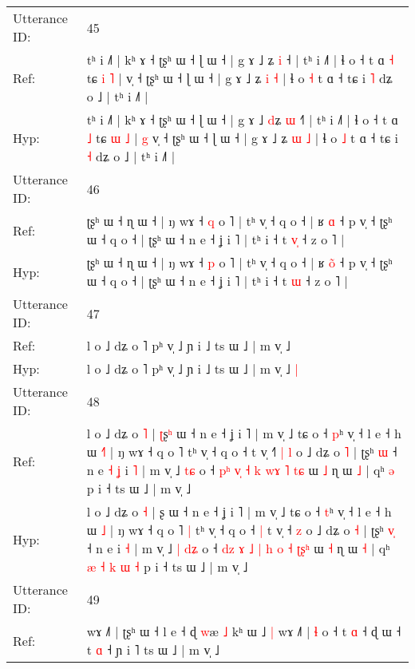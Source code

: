 \documentclass[10pt]{article}
\DeclareRobustCommand{\hl}[1]{{\textcolor{red}{#1}}}
\begin{document}
\begin{longtable}{ll}
\midrule
Utterance ID: & 45 \\
Ref: & tʰ i ˩˥ | kʰ ɤ ˧ ʈʂʰ ɯ ˧ ɭ ɯ ˧ | g ɤ ˩ \hl{}ʑ \hl{i} ˧\hl{} | tʰ i ˩˥ | ɬ o ˧ t ɑ \hl{˧} tɕ \hl{i} \hl{˥} |\hl{}\hl{} v̩ ˧ ʈʂʰ ɯ ˧ ɭ ɯ ˧ | g ɤ ˩ ʑ \hl{i} \hl{˧} | ɬ o \hl{˧} t ɑ ˧ tɕ i \hl{˥} dʑ o ˩ | tʰ i ˩˥ |
 \\
Hyp: & tʰ i ˩˥ | kʰ ɤ ˧ ʈʂʰ ɯ ˧ ɭ ɯ ˧ | g ɤ ˩ \hl{d}ʑ \hl{ɯ} ˧\hl{˥} | tʰ i ˩˥ | ɬ o ˧ t ɑ \hl{˩} tɕ \hl{ɯ} \hl{˩} |\hl{ }\hl{g} v̩ ˧ ʈʂʰ ɯ ˧ ɭ ɯ ˧ | g ɤ ˩ ʑ \hl{ɯ} \hl{˩} | ɬ o \hl{˩} t ɑ ˧ tɕ i \hl{˧} dʑ o ˩ | tʰ i ˩˥ |
 \\
\midrule
Utterance ID: & 46 \\
Ref: & ʈʂʰ ɯ ˧ ɳ ɯ ˧ | ŋ wɤ ˧ \hl{q} o ˥ | tʰ v̩ ˧ q o ˧ | ʁ \hl{}\hl{ɑ} ˧ p v̩ ˧ ʈʂʰ ɯ ˧ q o ˧ | ʈʂʰ ɯ ˧ n e ˧ ʝ i ˥ | tʰ i ˧ t \hl{v}\hl{̩} ˧ z o ˥ |
 \\
Hyp: & ʈʂʰ ɯ ˧ ɳ ɯ ˧ | ŋ wɤ ˧ \hl{p} o ˥ | tʰ v̩ ˧ q o ˧ | ʁ \hl{o}\hl{̃} ˧ p v̩ ˧ ʈʂʰ ɯ ˧ q o ˧ | ʈʂʰ ɯ ˧ n e ˧ ʝ i ˥ | tʰ i ˧ t \hl{}\hl{ɯ} ˧ z o ˥ |
 \\
\midrule
Utterance ID: & 47 \\
Ref: & l o ˩ dʑ o ˥ pʰ v̩ ˩ ɲ i ˩ ts ɯ ˩ | m v̩ ˩\hl{}\hl{}
 \\
Hyp: & l o ˩ dʑ o ˥ pʰ v̩ ˩ ɲ i ˩ ts ɯ ˩ | m v̩ ˩\hl{ }\hl{|}
 \\
\midrule
Utterance ID: & 48 \\
Ref: & l o ˩ dʑ o \hl{˥} | \hl{ʈ}ʂ\hl{ʰ} ɯ ˧ n e ˧ ʝ i ˥ | m v̩ ˩ tɕ o ˧ \hl{p}ʰ v̩ ˧ l e ˧ h ɯ \hl{˧}\hl{˥} | ŋ wɤ ˧ q o ˥\hl{}\hl{} tʰ v̩ ˧ q o ˧\hl{}\hl{} t v̩ ˧\hl{˥}\hl{ }\hl{|} \hl{l} o ˩ dʑ o \hl{˥} | ʈʂʰ \hl{}\hl{ɯ} ˧ n e\hl{ }\hl{˧}\hl{ }\hl{ʝ} i \hl{˥} | m v̩ ˩\hl{}\hl{} \hl{t}\hl{ɕ} o ˧ \hl{p}\hl{ʰ} \hl{v}\hl{̩} \hl{˧} \hl{k} \hl{}\hl{w}\hl{ɤ} \hl{˥} \hl{}\hl{t}\hl{ɕ} ɯ \hl{˩} ɳ ɯ \hl{˩} | qʰ\hl{}\hl{}\hl{}\hl{}\hl{}\hl{}\hl{}\hl{} \hl{ə} p i ˧ ts ɯ ˩ | m v̩ ˩
 \\
Hyp: & l o ˩ dʑ o \hl{˧} | \hl{}ʂ\hl{} ɯ ˧ n e ˧ ʝ i ˥ | m v̩ ˩ tɕ o ˧ \hl{t}ʰ v̩ ˧ l e ˧ h ɯ \hl{}\hl{˩} | ŋ wɤ ˧ q o ˥\hl{ }\hl{|} tʰ v̩ ˧ q o ˧\hl{ }\hl{|} t v̩ ˧\hl{}\hl{}\hl{} \hl{z} o ˩ dʑ o \hl{˧} | ʈʂʰ \hl{v}\hl{̩} ˧ n e\hl{}\hl{}\hl{}\hl{} i \hl{˧} | m v̩ ˩\hl{ }\hl{|} \hl{d}\hl{ʑ} o ˧ \hl{d}\hl{z} \hl{}\hl{ɤ} \hl{˩} \hl{|} \hl{h}\hl{ }\hl{o} \hl{˧} \hl{ʈ}\hl{ʂ}\hl{ʰ} ɯ \hl{˧} ɳ ɯ \hl{˧} | qʰ\hl{ }\hl{æ}\hl{ }\hl{˧}\hl{ }\hl{k}\hl{ }\hl{ɯ} \hl{˧} p i ˧ ts ɯ ˩ | m v̩ ˩
 \\
\midrule
Utterance ID: & 49 \\
Ref: & wɤ ˩˥ | ʈʂʰ ɯ ˧\hl{}\hl{} l e ˧ ɖ \hl{w}æ \hl{˩} kʰ ɯ ˩\hl{ }\hl{|} wɤ ˩\hl{˥} | \hl{ɬ} o ˧ t \hl{ɑ} ˧\hl{}\hl{} ɖ ɯ ˧ t \hl{ɑ} ˧ ɲ i ˥ ts ɯ ˩ | m v̩ ˩

\end{longtable}
\end{document}
